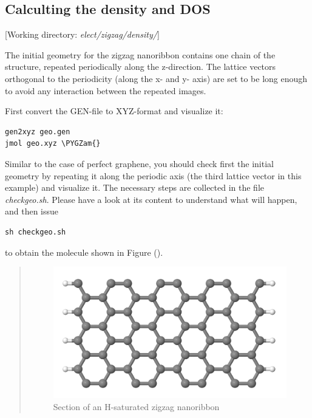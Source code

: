 \documentclass[a4paper,11pt,english]{sphinxmanual}
\def\PYGZam{\char`\&}
\begin{document}
{{\subsection{Calculting the density and DOS}
\label{electstruct:calculting-the-density-and-dos}
{[}Working directory: \emph{elect/zigzag/density/}{]}

The initial geometry for the zigzag nanoribbon contains one chain of
the structure, repeated periodically along the z-direction. The
lattice vectors orthogonal to the periodicity (along the x- and y-
axis) are set to be long enough to avoid any interaction between the
repeated images.

First convert the GEN-file to XYZ-format and visualize it:

\begin{Verbatim}[commandchars=\\\{\}]
gen2xyz geo.gen
jmol geo.xyz \PYGZam{}
\end{Verbatim}

Similar to the case of perfect graphene, you should check first the
initial geometry by repeating it along the periodic axis (the third
lattice vector in this example) and visualize it. The necessary steps
are collected in the file \emph{checkgeo.sh}. Please have a look at its
content to understand what will happen, and then issue

\begin{Verbatim}[commandchars=\\\{\}]
sh checkgeo.sh
\end{Verbatim}

to obtain the molecule shown in Figure {\hyperref[electstruct:fig-zigzag-114]{\emph{}}} ().
\begin{quote}
\begin{figure}[htbp]
\centering
\capstart

\includegraphics[width=0.600\linewidth]{geo-zigzag-114.png}
\caption{Section of an H-saturated zigzag nanoribbon}\label{electstruct:fig-zigzag-114}\end{figure}
\end{quote}

}}
\end{document}
